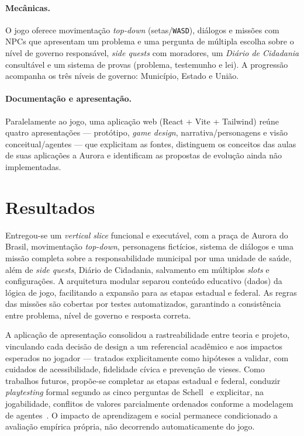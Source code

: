 \documentclass[10pt,twocolumn]{article}
\begin{document}
\paragraph{Mec\^anicas.} O jogo oferece movimenta\c{c}\~ao \emph{top-down}
(setas/\texttt{WASD}), di\'alogos e miss\~oes com NPCs que apresentam um problema e uma
pergunta de m\'ultipla escolha sobre o n\'ivel de governo respons\'avel, \emph{side
quests} com moradores, um \emph{Di\'ario de Cidadania} consult\'avel e um sistema de
provas (problema, testemunho e lei). A progress\~ao acompanha os tr\^es n\'iveis de
governo: Munic\'ipio, Estado e Uni\~ao.

\paragraph{Documenta\c{c}\~ao e apresenta\c{c}\~ao.} Paralelamente ao jogo, uma aplica\c{c}\~ao
web (React + Vite + Tailwind) re\'une quatro apresenta\c{c}\~oes --- prot\'otipo,
\emph{game design}, narrativa/personagens e vis\~ao conceitual/agentes --- que
explicitam as fontes, distinguem os conceitos das aulas de suas aplica\c{c}\~oes a
Aurora e identificam as propostas de evolu\c{c}\~ao ainda n\~ao implementadas.

\section{Resultados}

Entregou-se um \emph{vertical slice} funcional e execut\'avel, com a pra\c{c}a de
Aurora do Brasil, movimenta\c{c}\~ao \emph{top-down}, personagens fict\'icios, sistema de
di\'alogos e uma miss\~ao completa sobre a responsabilidade municipal por uma unidade
de sa\'ude, al\'em de \emph{side quests}, Di\'ario de Cidadania, salvamento em m\'ultiplos
\emph{slots} e configura\c{c}\~oes. A arquitetura modular separou conte\'udo educativo
(dados) da l\'ogica de jogo, facilitando a expans\~ao para as etapas estadual e federal.
As regras das miss\~oes s\~ao cobertas por testes automatizados, garantindo a
consist\^encia entre problema, n\'ivel de governo e resposta correta.

A aplica\c{c}\~ao de apresenta\c{c}\~ao consolidou a rastreabilidade entre teoria e projeto,
vinculando cada decis\~ao de design a um referencial acad\^emico e aos impactos
esperados no jogador --- tratados explicitamente como hip\'oteses a validar, com
cuidados de acessibilidade, fidelidade c\'ivica e preven\c{c}\~ao de vieses. Como
trabalhos futuros, prop\~oe-se completar as etapas estadual e federal, conduzir
\emph{playtesting} formal segundo as cinco perguntas de Schell~\cite{schell} e
explicitar, na jogabilidade, conflitos de valores parcialmente ordenados conforme a
modelagem de agentes~\cite{silva}. O impacto de aprendizagem e social permanece
condicionado a avalia\c{c}\~ao emp\'irica pr\'opria, n\~ao decorrendo automaticamente do jogo.
\end{document}

